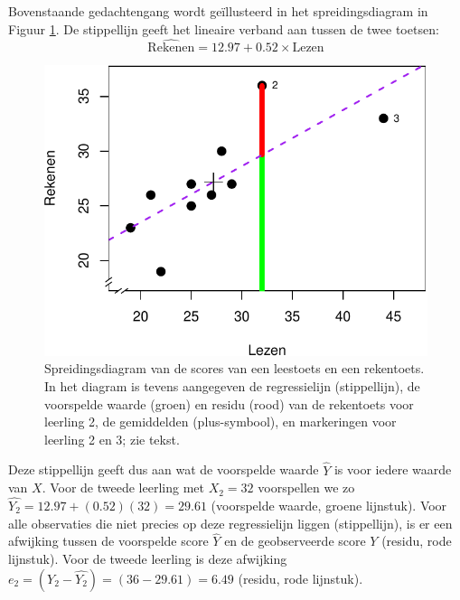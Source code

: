\documentclass[
]{book}
\begin{document}
Bovenstaande gedachtengang wordt geïllusteerd in het spreidingsdiagram
in Figuur \ref{fig:cito-linearmodel}. De stippellijn geeft het lineaire
verband aan tussen de twee toetsen:
\begin{equation}
    \widehat{\textrm{Rekenen}} = 12.97 + 0.52 \times \textrm{Lezen}
  \label{eq:cito-linearmodel}
\end{equation}

\begin{figure}

{\centering \includegraphics{KMS-NL_files/figure-latex/cito-linearmodel-1} 

}

\caption{Spreidingsdiagram van de scores van een leestoets en een rekentoets. In het diagram is tevens aangegeven de regressielijn (stippellijn), de voorspelde waarde (groen) en residu (rood) van de rekentoets voor leerling 2, de gemiddelden (plus-symbool), en markeringen voor leerling 2 en 3; zie tekst.}\label{fig:cito-linearmodel}
\end{figure}

Deze stippellijn geeft dus aan wat de voorspelde waarde \(\widehat{Y}\) is
voor iedere waarde van \(X\). Voor de tweede leerling met \(X_2 = 32\)
voorspellen we zo \(\widehat{Y_2} = 12.97 + (0.52) (32) = 29.61\)
(voorspelde waarde, groene lijnstuk). Voor alle observaties die niet
precies op deze regressielijn liggen (stippellijn),
is er een afwijking tussen de voorspelde
score \(\widehat{Y}\) en de geobserveerde score \(Y\) (residu, rode
lijnstuk). Voor de tweede leerling is deze afwijking
\(e_2 = (Y_2 - \widehat{Y_2}) = (36-29.61) = 6.49\) (residu, rode
lijnstuk).
\end{document}
